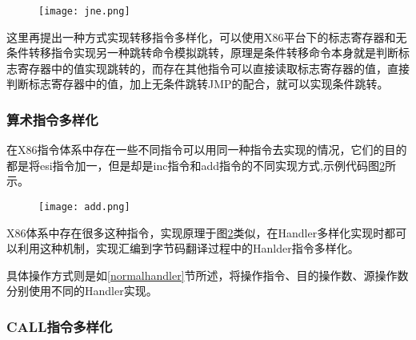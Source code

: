 \begin{figure}[htbp]
	\centering
	\texttt{[image: jne.png]}
	\label{jne}
\end{figure}


这里再提出一种方式实现转移指令多样化，可以使用X86平台下的标志寄存器和无条件转移指令实现另一种跳转命令模拟跳转，原理是条件转移命令本身就是判断标志寄存器中的值实现跳转的，而存在其他指令可以直接读取标志寄存器的值，直接判断标志寄存器中的值，加上无条件跳转JMP的配合，就可以实现条件跳转。









\subsubsection{算术指令多样化}


在X86指令体系中存在一些不同指令可以用同一种指令去实现的情况，它们的目的都是将esi指令加一，但是却是inc指令和add指令的不同实现方式,示例代码图\ref{add}所示。


\begin{figure}[htbp]
	\centering
	\texttt{[image: add.png]}
	\label{add}
\end{figure}


X86体系中存在很多这种指令，实现原理于图\ref{add}类似，在Handler多样化实现时都可以利用这种机制，实现汇编到字节码翻译过程中的Hanlder指令多样化。

具体操作方式则是如\ref{normalhandler}节所述，将操作指令、目的操作数、源操作数分别使用不同的Handler实现。


\subsubsection{CALL指令多样化}

